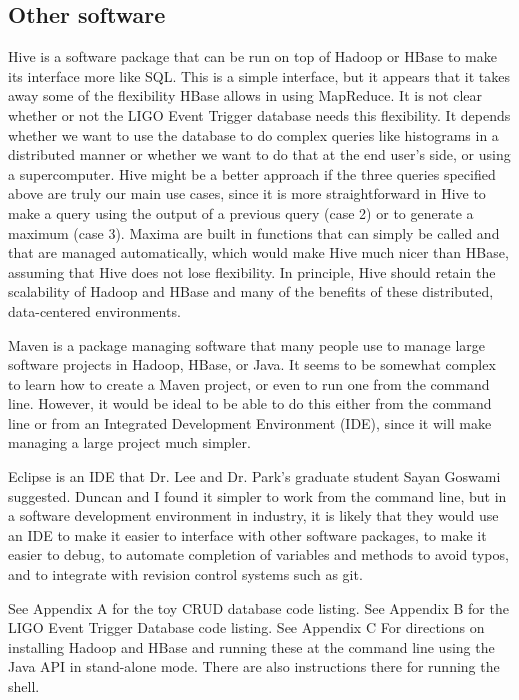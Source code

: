 \documentclass{article}
\begin{document}
\subsection{Other software}
\label{othersoftware}
Hive is a software package that can be run on top of Hadoop or HBase
to make its interface more like SQL. This is a simple interface, but
it appears that it takes away some of the flexibility HBase allows in
using MapReduce. It is not clear whether or not the LIGO Event Trigger
database needs this flexibility. It depends whether we want to use the
database to do complex queries like histograms in a distributed manner
or whether we want to do that at the end user's side, or using a
supercomputer. Hive might be a better approach if the three queries
specified above are truly our main use cases, since it is more
straightforward in Hive to make a query using the output of a previous
query (case 2) or to generate a maximum (case 3). Maxima are built in
functions that can simply be called and that are managed
automatically, which would make Hive much nicer than HBase, assuming
that Hive does not lose flexibility. In principle, Hive should retain
the scalability of Hadoop and HBase and many of the benefits of these
distributed, data-centered environments. 

Maven is a package managing software that many people use to manage
large software projects in Hadoop, HBase, or Java. It seems to be
somewhat complex to learn how to create a Maven project, or even to
run one from the command line. However, it would be ideal to be able
to do this either from the command line or from an Integrated
Development Environment (IDE), since it will make managing a large
project much simpler.

Eclipse is an IDE that Dr. Lee and Dr. Park's graduate student Sayan
Goswami suggested. Duncan and I found it simpler to work from the
command line, but in a software development environment in industry,
it is likely that they would use an IDE to make it easier to interface
with other software packages, to make it easier to debug, to automate
completion of variables and methods to avoid typos, and to integrate
with revision control systems such as git.

See Appendix A for the toy CRUD database code listing. See Appendix B
for the LIGO Event Trigger Database code listing. See Appendix C For
directions on installing Hadoop and HBase and running these at the
command line using the Java API in stand-alone mode. There are also
instructions there for running the shell.
\end{document}
